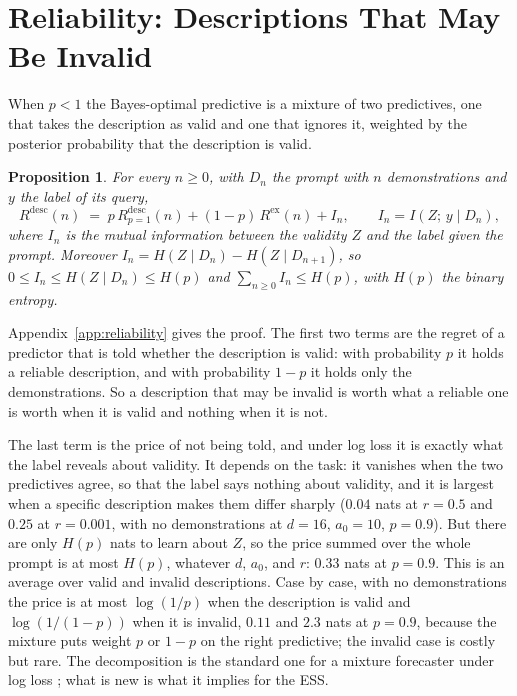 \documentclass[10pt]{article}
\newtheorem{proposition}[theorem]{Proposition}
\begin{document}
\section{Reliability: Descriptions That May Be Invalid}\label{sec:reliability}
When $p < 1$ the Bayes-optimal predictive is a mixture of two predictives, one that takes the description as valid and one that ignores it, weighted by the posterior probability that the description is valid.

\begin{proposition}\label{prop:unreliable}
For every $n \ge 0$, with $D_n$ the prompt with $n$ demonstrations and $y$ the label of its query,
\begin{equation}\label{eq:decomp}
    R^{\mathrm{desc}}(n) \;=\; p\, R^{\mathrm{desc}}_{p=1}(n) + (1-p)\, R^{\mathrm{ex}}(n) + I_n, \qquad I_n = I(Z;\, y \mid D_n),
\end{equation}
where $I_n$ is the mutual information between the validity $Z$ and the label given the prompt. Moreover $I_n = H(Z \mid D_n) - H(Z \mid D_{n+1})$, so $0 \le I_n \le H(Z \mid D_n) \le H(p)$ and $\sum_{n \ge 0} I_n \le H(p)$, with $H(p)$ the binary entropy.
\end{proposition}
Appendix~\ref{app:reliability} gives the proof. The first two terms are the regret of a predictor that is told whether the description is valid: with probability $p$ it holds a reliable description, and with probability $1-p$ it holds only the demonstrations. So a description that may be invalid is worth what a reliable one is worth when it is valid and nothing when it is not.

The last term is the price of not being told, and under log loss it is exactly what the label reveals about validity. It depends on the task: it vanishes when the two predictives agree, so that the label says nothing about validity, and it is largest when a specific description makes them differ sharply ($0.04$ nats at $r = 0.5$ and $0.25$ at $r = 0.001$, with no demonstrations at $d = 16$, $a_0 = 10$, $p = 0.9$). But there are only $H(p)$ nats to learn about $Z$, so the price summed over the whole prompt is at most $H(p)$, whatever $d$, $a_0$, and $r$: $0.33$ nats at $p = 0.9$. This is an average over valid and invalid descriptions. Case by case, with no demonstrations the price is at most $\log(1/p)$ when the description is valid and $\log(1/(1-p))$ when it is invalid, $0.11$ and $2.3$ nats at $p = 0.9$, because the mixture puts weight $p$ or $1-p$ on the right predictive; the invalid case is costly but rare. The decomposition is the standard one for a mixture forecaster under log loss \citep{cesabianchi2006, merhav1998}; what is new is what it implies for the ESS.
\end{document}
